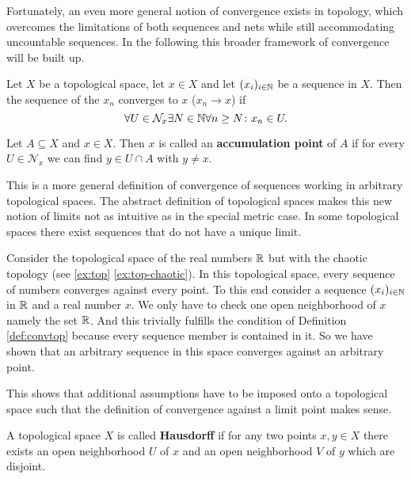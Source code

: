 Fortunately, an even more general notion of convergence exists in topology, which overcomes the limitations of both sequences and nets while still accommodating uncountable sequences. In the following this broader framework of convergence will be built up.

\begin{defin}\label{def:convtop}
  Let $X$ be a topological space, let $x \in X$ and let $(x_i)_{i \in \mathbb{N}}$ be a sequence in $X$. Then the sequence of the $x_n$ converges to $x$ ($x_n \to x$) if
  \begin{equation*}
    \forall U \in \mathcal{N}_x\exists N\in\mathbb{N}\forall n \geq N\colon x_n \in U.
  \end{equation*}

  Let $A \subseteq X$ and $x \in X$. Then $x$ is called an \textbf{accumulation point} of $A$ if for every $U \in \mathcal{N}_x$ we can find $y \in U \cap A$ with $y \neq x$.
\end{defin}
This is a more general definition of convergence of sequences working in arbitrary topological spaces. The abstract definition of topological spaces makes this new notion of limits not as intuitive as in the special metric case. In some topological spaces there exist sequences that do not have a unique limit.

\begin{ex}
  Consider the topological space of the real numbers $\mathbb{R}$ but with the chaotic topology (see \ref{ex:top} \ref{ex:top-chaotic}). In this topological space, every sequence of numbers converges against every point. To this end consider a sequence $(x_i)_{i\in\mathbb{N}}$ in $\mathbb{R}$ and a real number $x$. We only have to check one open neighborhood of $x$ namely the set $\mathbb{R}$. And this trivially fulfills the condition of Definition \ref{def:convtop} because every sequence member is contained in it. So we have shown that an arbitrary sequence in this space converges against an arbitrary point.  
\end{ex}

This shows that additional assumptions have to be imposed onto a topological space such that the definition of convergence against a limit point makes sense.

\begin{defin}
  A topological space $X$ is called \textbf{Hausdorff} if for any two points $x, y \in X$ there exists an open neighborhood $U$ of $x$ and an open neighborhood $V$ of $y$ which are disjoint.   
\end{defin}

